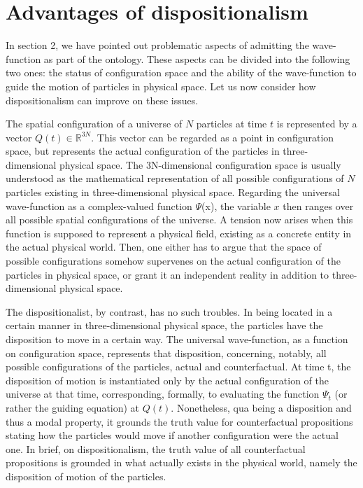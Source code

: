 \documentclass[12pt]{article}
\newcommand{\R}{\mathbb R}
\theoremstyle{definition}
\begin{document}
\section{Advantages of dispositionalism}

In section 2, we have pointed out problematic aspects of admitting the wave-function as part of the ontology. These aspects can be divided into the following two ones: the status of configuration space and the ability of the wave-function to guide the motion of particles in physical space. Let us now consider how dispositionalism can improve on these issues.

The spatial configuration of a universe of $N$ particles at time $t$ is represented by a vector $Q(t) \in \R^{3N}$. This vector can be regarded as a point in configuration space, but represents the actual configuration of the particles in three-dimensional physical space. The 3N-dimensional configuration space is usually understood as the mathematical representation of all possible configurations of $N$ particles existing in three-dimensional physical space. Regarding the universal wave-function as a complex-valued function $\Psi$(x), the variable $x$ then ranges over all possible spatial configurations of the universe. A tension now arises when this function is supposed to represent a physical field, existing as a concrete entity in the actual physical world. Then, one either has to argue that the space of possible configurations somehow supervenes on the actual configuration of the particles in physical space, or grant it an independent reality in addition to three-dimensional physical space.

The dispositionalist, by contrast, has no such troubles. In being located in a certain manner in three-dimensional physical space, the particles have the disposition to move in a certain way. The universal wave-function, as a function on configuration space, represents that disposition, concerning, notably, all possible configurations of the particles, actual and counterfactual. At time t, the disposition of motion is instantiated only by the actual configuration of the universe at that time, corresponding, formally, to evaluating the function $\Psi_t$ (or rather the guiding equation) at $Q(t)$. Nonetheless, qua being a disposition and thus a modal property, it grounds the truth value for counterfactual propositions stating how the particles would move if another configuration were the actual one. In brief, on dispositionalism, the truth value of all counterfactual propositions is grounded in what actually exists in the physical world, namely the disposition of motion of the particles.
\end{document}
